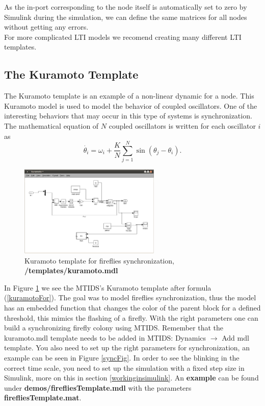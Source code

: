 \documentclass[a4paper,twoside, openright,12pt]{report}
\begin{document}
As the in-port corresponding to the node itself is automatically set to zero by Simulink during the simulation, we can define the same matrices for all 
nodes without getting any errors.
\\

For more complicated LTI models we recomend creating many different LTI templates.

\subsection{The Kuramoto Template}
The Kuramoto template is an example of a non-linear dynamic for a node. This Kuramoto model is used to model the behavior of coupled oscillators. One of the interesting behaviors
that may occur in this type of systems is synchronization. The mathematical equation of $N$ coupled oscillators is written for each oscillator $i$ as
\begin{equation}\label{kuramotoFor}
 \dot{\theta_i} = \omega_i + \frac{K}{N} \sum_{j=1}^N \sin(\theta_j-\theta_i). 
\end{equation}



\begin{figure}[htb]
\centering
\includegraphics[width=0.6\textwidth]{pics/screenKuramoto.eps}
\caption[MTIDS Kuramoto Template]{Kuramoto template for fireflies synchronization, \textbf{/templates/kuramoto.mdl}}
\label{templateKuramotoFig}
\end{figure}
 
In Figure \ref{templateKuramotoFig} we see  the MTIDS's Kuramoto template after formula (\ref{kuramotoFor}). The goal was to model fireflies synchronization, thus
the model has an embedded function that changes the color of the parent block for a defined threshold, this mimics the flashing of a firefly.
With the right parameters one can build a synchronizing firefly colony using MTIDS. Remember that the kuramoto.mdl template needs to be added in MTIDS:
Dynamics $\rightarrow$ Add mdl template. You also need to set up the right parameters for synchronization, an example can be seen in Figure \ref{syncFig}.
In order to see the blinking in the correct time scale, you need to set up the simulation with a fixed step size in Simulink, more on this in section 
\ref{workinginsimulink}. An \textbf{example} can be found under \textbf{demos/firefliesTemplate.mdl} with the parameters \textbf{firefliesTemplate.mat}.
\end{document}
